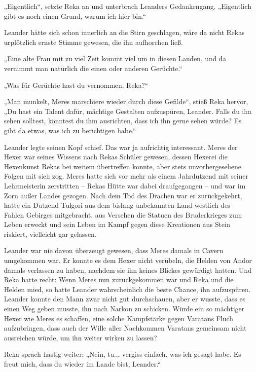 „Eigentlich“, setzte Reka an und unterbrach Leanders Gedankengang, „Eigentlich gibt es noch einen Grund, warum ich hier bin.“

Leander hätte sich schon innerlich an die Stirn geschlagen, wäre da nicht Rekas urplötzlich ernste Stimme gewesen, die ihn aufhorchen ließ.

„Eine alte Frau mit zu viel Zeit kommt viel um in diesen Landen, und da vernimmt man natürlich die einen oder anderen Gerüchte.“

„Was für Gerüchte hast du vernommen, Reka?“

„Man munkelt, Meres marschiere wieder durch diese Gefilde“, stieß Reka hervor, „Du hast ein Talent dafür, mächtige Gestalten aufzuspüren, Leander. Falls du ihn sehen solltest, könntest du ihm ausrichten, dass ich ihn gerne sehen würde? Es gibt da etwas, was ich zu berichtigen habe.“

Leander legte seinen Kopf schief. Das war ja aufrichtig interessant. Meres der Hexer war seines Wissens nach Rekas Schüler gewesen, dessen Hexerei die Hexenkunst Rekas bei weitem übertreffen konnte, aber stets unvorhergesehene Folgen mit sich zog. Meres hatte sich vor mehr als einem Jahrdutzend mit seiner Lehrmeisterin zerstritten – Rekas Hütte war dabei draufgegangen – und war im Zorn außer Landes gezogen. Nach dem Tod des Drachen war er zurückgekehrt, hatte ein Dutzend Tulgori aus dem bislang unbekannten Land westlich des Fahlen Gebirges mitgebracht, aus Versehen die Statuen des Bruderkrieges zum Leben erweckt und sein Leben im Kampf gegen diese Kreationen aus Stein riskiert, vielleicht gar gelassen.

Leander war nie davon überzeugt gewesen, dass Meres damals in Cavern umgekommen war. Er konnte es dem Hexer nicht verübeln, die Helden von Andor damals verlassen zu haben, nachdem sie ihn keines Blickes gewürdigt hatten. Und Reka hatte recht: Wenn Meres nun zurückgekommen war und Reka und die Helden mied, so hatte Leander wahrscheinlich die beste Chance, ihn aufzuspüren. Leander konnte den Mann zwar nicht gut durchschauen, aber er wusste, dass es einen Weg geben musste, ihn nach Narkon zu schicken. Würde ein so mächtiger Hexer wie Meres es schaffen, eine solche Kampfstärke gegen Varatans Fluch aufzubringen, dass auch der Wille aller Nachkommen Varatans gemeinsam nicht ausreichen würde, um ihn weiter wirken zu lassen?

Reka sprach hastig weiter: „Nein, tu... vergiss einfach, was ich gesagt habe. Es freut mich, dass du wieder im Lande bist, Leander.“

